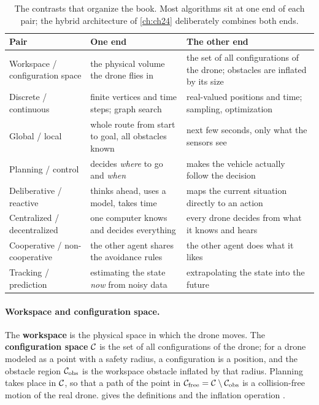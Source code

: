 \begin{table}[tb]
  \centering\small
  \caption{The contrasts that organize the book. Most algorithms sit at one end of
    each pair; the hybrid architecture of \cref{ch:ch24} deliberately combines both
    ends.}
  \label{tab:ch01-contrasts}
  \begin{tabularx}{\textwidth}{@{}lYY@{}}
  \toprule
  Pair & One end & The other end\\
  \midrule
  Workspace / configuration space & the physical volume the drone flies in & the set of all configurations of the drone; obstacles are inflated by its size\\
  Discrete / continuous & finite vertices and time steps; graph search & real-valued positions and time; sampling, optimization\\
  Global / local & whole route from start to goal, all obstacles known & next few seconds, only what the sensors see\\
  Planning / control & decides \emph{where} to go and \emph{when} & makes the vehicle actually follow the decision\\
  Deliberative / reactive & thinks ahead, uses a model, takes time & maps the current situation directly to an action\\
  Centralized / decentralized & one computer knows and decides everything & every drone decides from what it knows and hears\\
  Cooperative / non-cooperative & the other agent shares the avoidance rules & the other agent does what it likes\\
  Tracking / prediction & estimating the state \emph{now} from noisy data & extrapolating the state into the future\\
  \bottomrule
  \end{tabularx}
\end{table}

\paragraph{Workspace and configuration space.}
The \textbf{workspace} is the physical space in which the drone
moves. The \textbf{configuration space} $\mathcal{C}$ is the
set of all configurations of the drone; for a drone modeled as a point with a safety
radius, a configuration is a position, and the obstacle region $\mathcal{C}_{\mathrm{obs}}$ is the
workspace obstacle inflated by that radius. Planning takes place in $\mathcal{C}$, so that
a path of the point in $\mathcal{C}_{\mathrm{free}}=\mathcal{C}\setminus\mathcal{C}_{\mathrm{obs}}$ is a collision-free motion of
the real drone.  gives the definitions and the inflation operation
\cite{lavalle2006planning}.

